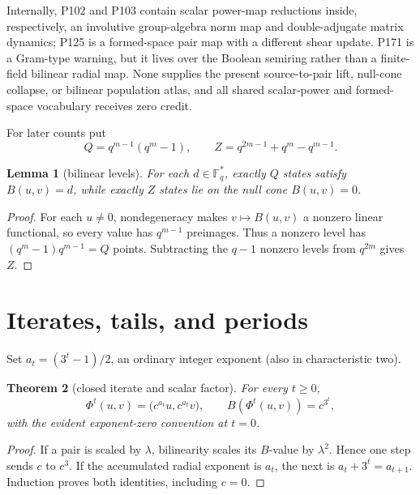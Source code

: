\documentclass[a4paper,10pt]{amsart}
\newtheorem{theorem}{Theorem}[section]
\newtheorem{lemma}[theorem]{Lemma}
\theoremstyle{remark}
\newcommand{\Fq}{\mathbb F_q}
\newcommand{\1}{\mathbf 1}
\begin{document}
Internally, P102 and P103 contain scalar power-map reductions inside,
respectively, an involutive group-algebra norm map and double-adjugate matrix
dynamics; P125 is a formed-space pair map with a different shear update.
P171 is a Gram-type warning, but it lives over the Boolean semiring rather
than a finite-field bilinear radial map.  None supplies the present
source-to-pair lift, null-cone collapse, or bilinear population atlas, and all
shared scalar-power and formed-space vocabulary receives zero credit.

For later counts put
\begin{equation}\label{eq:QZ}
 Q=q^{m-1}(q^m-1),\qquad
 Z=q^{2m-1}+q^m-q^{m-1}.
\end{equation}

\begin{lemma}[bilinear levels]\label{lem:levels}
For each $d\in\Fq^*$, exactly $Q$ states satisfy $B(u,v)=d$, while exactly
$Z$ states lie on the null cone $B(u,v)=0$.
\end{lemma}

\begin{proof}
For each $u\ne0$, nondegeneracy makes $v\mapsto B(u,v)$ a nonzero linear
functional, so every value has $q^{m-1}$ preimages.  Thus a nonzero level has
$(q^m-1)q^{m-1}=Q$ points.  Subtracting the $q-1$ nonzero levels from
$q^{2m}$ gives $Z$.
\end{proof}

\section{Iterates, tails, and periods}

Set $a_t=(3^t-1)/2$, an ordinary integer exponent (also in characteristic
two).

\begin{theorem}[closed iterate and scalar factor]\label{thm:iterate}
For every $t\ge0$,
\begin{equation}\label{eq:iterate}
 \Phi^t(u,v)=\bigl(c^{a_t}u,c^{a_t}v\bigr),
 \qquad B(\Phi^t(u,v))=c^{3^t},
\end{equation}
with the evident exponent-zero convention at $t=0$.
\end{theorem}

\begin{proof}
If a pair is scaled by $\lambda$, bilinearity scales its $B$-value by
$\lambda^2$.  Hence one step sends $c$ to $c^3$.  If the accumulated radial
exponent is $a_t$, the next is $a_t+3^t=a_{t+1}$.  Induction proves both
identities, including $c=0$.
\end{proof}
\end{document}
